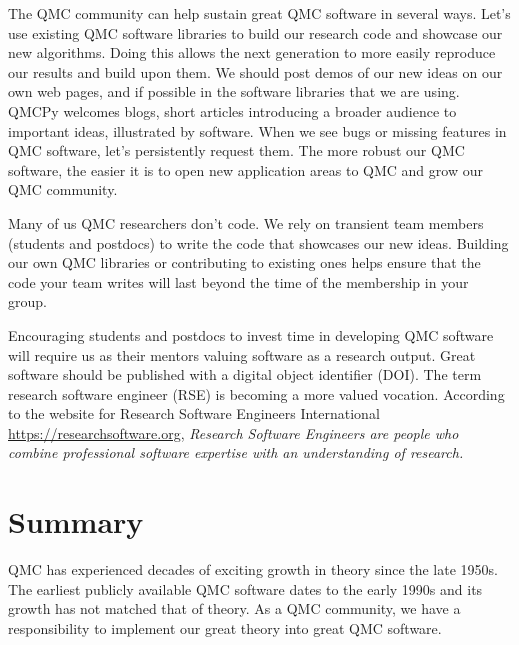 \documentclass[graybox]{svmult}
\begin{document}
The QMC community can help sustain great QMC software in several ways.  Let's use existing QMC software libraries to build our research code and showcase our new algorithms.  Doing this allows the next generation to more easily reproduce our results and build upon them.  We should post demos of our new ideas on our own web pages, and if possible in the software libraries that we are using.  QMCPy welcomes blogs, short articles introducing a broader audience to important ideas, illustrated by software.  When we see bugs or missing features in QMC software, let's persistently request them.  The more robust our QMC software, the easier it is to open new application areas to QMC and grow our QMC community.

Many of us QMC researchers don't code.  We rely on transient team members (students and postdocs) to write the code that showcases our new ideas.  Building our own QMC libraries or contributing to existing ones helps ensure that the code your team writes will last beyond the time of the membership in your group.

Encouraging students and postdocs to invest time in developing QMC software will require us as their mentors valuing software as a research output.  Great software should be published with a digital object identifier (DOI).  The term research software engineer (RSE) is becoming a more valued vocation.  According to the website for  Research Software Engineers International 	\url{https://researchsoftware.org}, \emph{Research Software Engineers are people who combine professional software expertise with an understanding of research.}

\section{Summary}
QMC has experienced decades of exciting growth in theory since the late 1950s.  The earliest publicly available QMC software dates to the early 1990s and its growth has not matched that of theory.  As a QMC community, we have a responsibility to implement our great theory into great QMC software.




\end{document}
